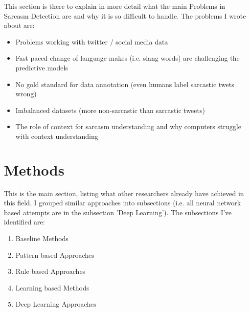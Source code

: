 \documentclass[sigconf,  review=false, nonacm=true]{acmart}
\begin{document}
This section is there to explain in more detail what the main Problems in Sarcasm Detection are and why it is so difficult to handle. The problems I wrote about are:
\begin{itemize} 
	\item Problems working with twitter / social media data \cite{The-effect-of-preprocessing-techniques-on-Twitter-sentiment-analysis} \cite{Analysis-of-Twitter-Specific-Preprocessing-Technique-for-Tweets}
	\item Fast paced change of language makes (i.e. slang words) are challenging the predictive models \cite{Sarcasm_detection_of_tweets}
    \item No gold standard for data annotation (even humans label sarcastic twets wrong)
	\item Imbalanced datasets (more non-sarcastic than sarcastic tweets)
    \item The role of context for sarcasm understanding and why computers struggle with context understanding \cite{The-Role-of-Conversation-Context-for-Sarcasm-Detection-in-Online-Interactions} \cite{Twitter-Sarcasm-Detection-Exploiting-a-Context-Based-Model}
\end{itemize}


\section{Methods}

This is the main section, listing what other researchers already have achieved in this field. I grouped similar approaches into subsections (i.e. all neural network based attempts are in the subsection 'Deep Learning'). The subsections I've identified are:

\begin{enumerate} 
    \item Baseline Methods \cite{A-multidimensional-approach-for-detecting-irony-in-Twitter} \cite{Clues-for-Detecting-Irony-in-User-Generated-Contents}
    \item Pattern based Approaches \cite{pattern}
    \item Rule based Approaches \cite{Parsing-based-sarcasm-sentiment-recognition-in-Twitter-data}
    \item Learning based Methods \cite{baseline2}
    \item Deep Learning Approaches \cite{rnn}
\end{enumerate}
\end{document}
